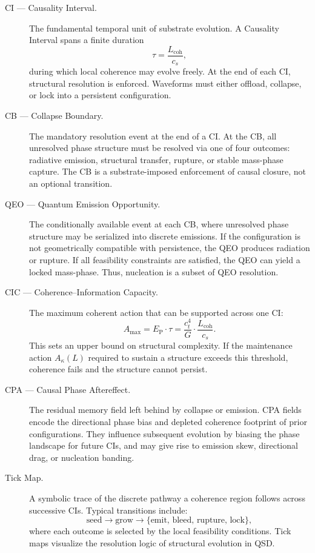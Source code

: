 \documentclass[preprints,article,submit,pdftex,moreauthors]{Definitions/mdpi}
\begin{document}
\begin{description}

  \item[CI — Causality Interval.]
  The fundamental temporal unit of substrate evolution.  
  A Causality Interval spans a finite duration  
  \[
  \tau = \frac{L_{\mathrm{coh}}}{c_s},
  \]
  during which local coherence may evolve freely. At the end of each CI, structural resolution is enforced. Waveforms must either offload, collapse, or lock into a persistent configuration.

  \item[CB — Collapse Boundary.]  
  The mandatory resolution event at the end of a CI.  
  At the CB, all unresolved phase structure must be resolved via one of four outcomes:  
  radiative emission, structural transfer, rupture, or stable mass-phase capture.  
  The CB is a substrate-imposed enforcement of causal closure, not an optional transition.

  \item[QEO — Quantum Emission Opportunity.]  
  The conditionally available event at each CB, where unresolved phase structure may be serialized into discrete emissions.  
  If the configuration is not geometrically compatible with persistence, the QEO produces radiation or rupture.  
  If all feasibility constraints are satisfied, the QEO can yield a locked mass-phase. Thus, nucleation is a subset of QEO resolution.

  \item[CIC — Coherence–Information Capacity.]  
  The maximum coherent action that can be supported across one CI:  
  \[
  A_{\max} = E_{\mathrm{P}} \cdot \tau = \frac{c_t^4}{G}\cdot\frac{L_{\mathrm{coh}}}{c_s}.
  \]  
  This sets an upper bound on structural complexity.  
  If the maintenance action \( A_\kappa(L) \) required to sustain a structure exceeds this threshold, coherence fails and the structure cannot persist.

  \item[CPA — Causal Phase Aftereffect.]  
  The residual memory field left behind by collapse or emission.  
  CPA fields encode the directional phase bias and depleted coherence footprint of prior configurations.  
  They influence subsequent evolution by biasing the phase landscape for future CIs, and may give rise to emission skew, directional drag, or nucleation banding.

  \item[Tick Map.]  
  A symbolic trace of the discrete pathway a coherence region follows across successive CIs.  
  Typical transitions include:
  \[
  \text{seed} \rightarrow \text{grow} \rightarrow \{\text{emit},\,\text{bleed},\,\text{rupture},\,\text{lock}\},
  \]
  where each outcome is selected by the local feasibility conditions.  
  Tick maps visualize the resolution logic of structural evolution in QSD.


\end{description}
\end{document}
